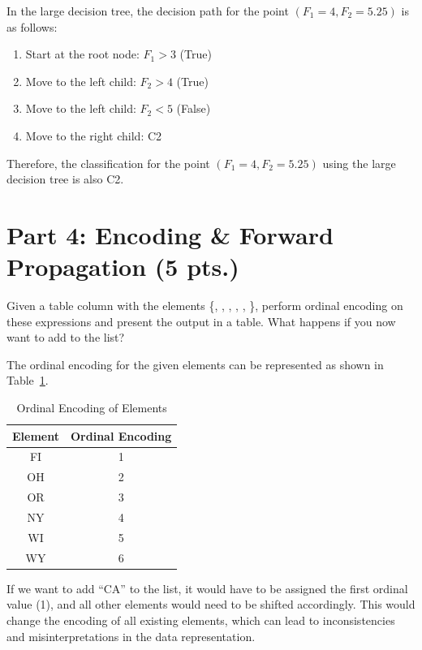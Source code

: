\documentclass[12pt]{article}
\begin{document}
\begin{ejercicio}
        In the large decision tree, the decision path for the point $(F_1 = 4, F_2 = 5.25)$ is as follows:
        \begin{enumerate}
            \item Start at the root node: $F_1 > 3$ (True)
            \item Move to the left child: $F_2 > 4$ (True)
            \item Move to the left child: $F_2 < 5$ (False)
            \item Move to the right child: C2
        \end{enumerate}
        Therefore, the classification for the point $(F_1 = 4, F_2 = 5.25)$ using the large decision tree is also C2.
    \end{ejercicio}

    \newpage


    \section*{Part 4: Encoding \& Forward Propagation (5 pts.)}

    \begin{ejercicio}
        Given a table column with the elements \{, , , , , \}, perform ordinal encoding on these expressions and present the output in a table. What happens if you now want to add  to the list?

        The ordinal encoding for the given elements can be represented as shown in Table~\ref{tab:ordinal_encoding}.
        \begin{table}[h!]
        \centering
        \begin{tabular}{|c|c|}
        \hline
        \textbf{Element} & \textbf{Ordinal Encoding} \\ \hline
        FI & 1 \\ \hline
        OH & 2 \\ \hline
        OR & 3 \\ \hline
        NY & 4 \\ \hline
        WI & 5 \\ \hline
        WY & 6 \\ \hline
        \end{tabular}
        \caption{Ordinal Encoding of Elements}
        \label{tab:ordinal_encoding}
        \end{table}

        If we want to add ``CA'' to the list, it would have to be assigned the first ordinal value (1), and all other elements would need to be shifted accordingly. This would change the encoding of all existing elements, which can lead to inconsistencies and misinterpretations in the data representation.
    \end{ejercicio}
\end{document}
